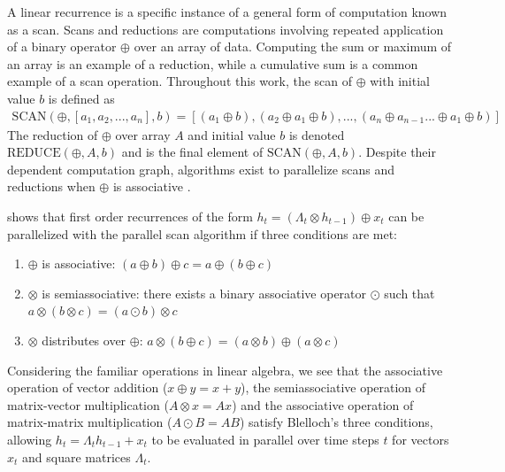 \documentclass{article}
\providecommand{\scan}{\text{SCAN}}
\providecommand{\reduce}{\text{REDUCE}}
\begin{document}
A linear recurrence is a specific instance of a general form of computation known as a scan.
Scans and reductions are computations involving repeated application of a binary
operator $\oplus$ over an array of data. Computing the sum or maximum
of an array is an example of a reduction, while a cumulative sum is a common
example of a scan operation. Throughout this work, the scan of $\oplus$ with
initial value $b$ is defined as
\begin{align*}
\scan(\oplus, [a_1, a_2, ..., a_n], b) = [(a_1 \oplus b), (a_2 \oplus a_1 \oplus b), ..., (a_n \oplus a_{n-1} ... \oplus a_1 \oplus b)]
\end{align*}
The reduction of $\oplus$ over array $A$ and initial value $b$ is denoted
$\reduce(\oplus, A, b)$ and is the final element of $\scan(\oplus, A, b)$.
Despite their dependent computation graph, algorithms exist to parallelize scans
and reductions when $\oplus$ is associative \cite{ladner1980parallel}.

\citet{blelloch1990prefix} shows that first order recurrences of the form
$h_t = (\Lambda_t \otimes h_{t-1}) \oplus x_t$ can be parallelized with
the parallel scan algorithm if three conditions are met:

\begin{enumerate}
\item $\oplus$ is associative: $(a \oplus b) \oplus c = a \oplus (b \oplus c)$
\item $\otimes$ is semiassociative: there exists a binary associative operator
$\odot$ such that $a \otimes (b \otimes c) = (a \odot b) \otimes c$
\item $\otimes$ distributes over $\oplus$: $a\otimes(b\oplus c) = (a\otimes b) \oplus (a \otimes c)$
\end{enumerate}

Considering the familiar operations in linear algebra, we see that the
associative operation of vector addition
($x \oplus y = x + y$), the
semiassociative operation of matrix-vector multiplication
($A \otimes x = Ax$) and the associative operation of
matrix-matrix multiplication ($A \odot B=AB$) satisfy Blelloch's three
conditions, allowing $h_t = \Lambda_t h_{t-1} + x_t$ to be evaluated in parallel
over time steps \(t\) for vectors $x_t$ and square matrices $\Lambda_t$.
\end{document}
